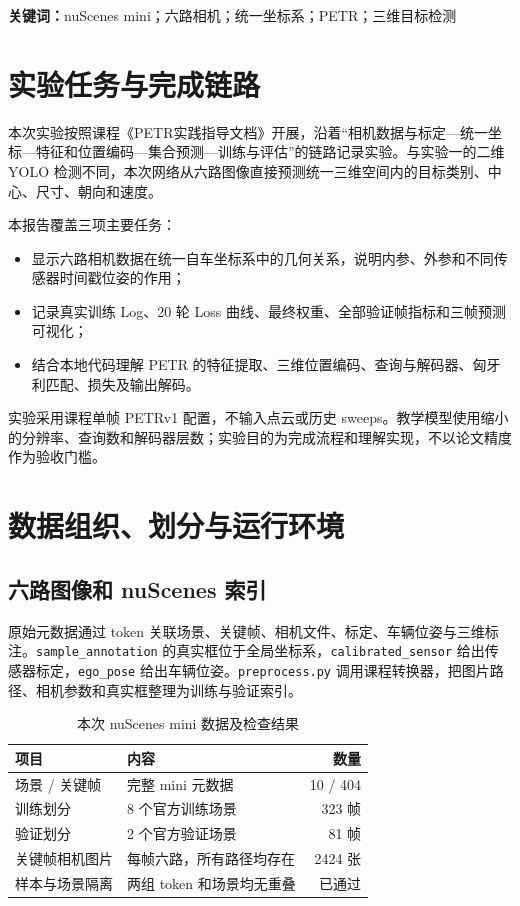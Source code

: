 \documentclass[UTF8,zihao=-4,fontset=windows]{ctexart}
\begin{document}
\noindent\textbf{关键词：}nuScenes mini；六路相机；统一坐标系；PETR；三维目标检测

\clearpage
\section{实验任务与完成链路}

本次实验按照课程《PETR实践指导文档》开展，沿着“相机数据与标定---统一坐标---特征和位置编码---集合预测---训练与评估”的链路记录实验。与实验一的二维 YOLO 检测不同，本次网络从六路图像直接预测统一三维空间内的目标类别、中心、尺寸、朝向和速度。

本报告覆盖三项主要任务：
\begin{itemize}
  \item 显示六路相机数据在统一自车坐标系中的几何关系，说明内参、外参和不同传感器时间戳位姿的作用；
  \item 记录真实训练 Log、20 轮 Loss 曲线、最终权重、全部验证帧指标和三帧预测可视化；
  \item 结合本地代码理解 PETR 的特征提取、三维位置编码、查询与解码器、匈牙利匹配、损失及输出解码。
\end{itemize}

实验采用课程单帧 PETRv1 配置，不输入点云或历史 sweeps。教学模型使用缩小的分辨率、查询数和解码器层数；实验目的为完成流程和理解实现，不以论文精度作为验收门槛。

\section{数据组织、划分与运行环境}
\subsection{六路图像和 nuScenes 索引}

原始元数据通过 token 关联场景、关键帧、相机文件、标定、车辆位姿与三维标注。\texttt{sample\_annotation} 的真实框位于全局坐标系，\texttt{calibrated\_sensor} 给出传感器标定，\texttt{ego\_pose} 给出车辆位姿。\texttt{preprocess.py} 调用课程转换器，把图片路径、相机参数和真实框整理为训练与验证索引。

\begin{table}[H]
\centering
\caption{本次 nuScenes mini 数据及检查结果}
\begin{tabularx}{\textwidth}{p{4.0cm}Xr}
\toprule
项目 & 内容 & 数量 \\
\midrule
场景 / 关键帧 & 完整 mini 元数据 & 10 / 404 \\
训练划分 & 8 个官方训练场景 & 323 帧 \\
验证划分 & 2 个官方验证场景 & 81 帧 \\
关键帧相机图片 & 每帧六路，所有路径均存在 & 2424 张 \\
样本与场景隔离 & 两组 token 和场景均无重叠 & 已通过 \\
\bottomrule
\end{tabularx}
\end{table}
\end{document}
